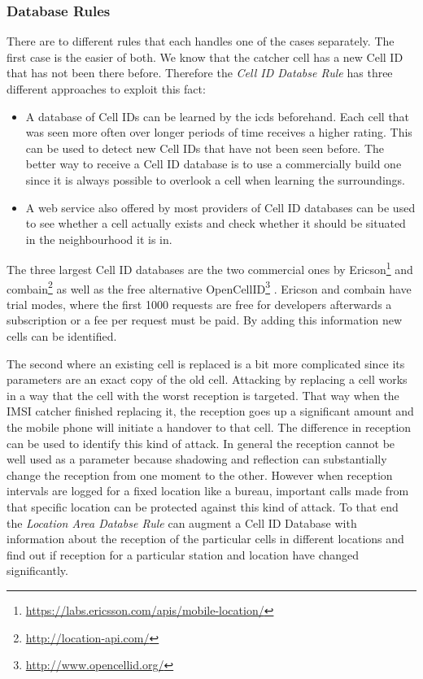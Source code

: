 \subsubsection{Database Rules}
There are to different rules that each handles one of the cases separately.
The first case is the easier of both.
We know that the catcher cell has a new Cell ID that has not been there before.
Therefore the \emph{Cell ID Databse Rule} has three different approaches to exploit this fact:
\begin{itemize}
	\item A database of Cell IDs can be learned by the \gls{icds} beforehand. 
	Each cell that was seen more often over longer periods of time receives a higher rating.
	This can be used to detect new Cell IDs that have not been seen before.
	The better way to receive a Cell ID database is to use a commercially build one since it is always possible to overlook a cell when learning the surroundings.
	\item A web service also offered by most providers of Cell ID databases can be used to see whether a cell actually exists and check whether it should be situated in the neighbourhood it is in.
\end{itemize}
The three largest Cell ID databases are the two commercial ones by Ericson\footnote{\url{https://labs.ericsson.com/apis/mobile-location/}} and combain\footnote{\url{http://location-api.com/}} as well as the free alternative OpenCellID\footnote{\url{http://www.opencellid.org/}} \cite{wiki_cells}.
Ericson and combain have trial modes, where the first 1000 requests are free for developers afterwards a subscription or a fee per request must be paid.
By adding this information new cells can be identified.

The second where an existing cell is replaced is a bit more complicated since its parameters are an exact copy of the old cell.
Attacking by replacing a cell works in a way that the cell with the worst reception is targeted.
That way when the IMSI catcher finished replacing it, the reception goes up a significant amount and the mobile phone will initiate a handover to that cell.
The difference in reception can be used to identify this kind of attack.
In general the reception cannot be well used as a parameter because shadowing and reflection can substantially change the reception from one moment to the other.
However when reception intervals are logged for a fixed location like a bureau, important calls made from that specific location can be protected against this kind of attack.
To that end the \emph{Location Area Databse Rule} can augment a Cell ID Database with information about the reception of the particular cells in different locations and find out if reception for a particular station and location have changed significantly.

